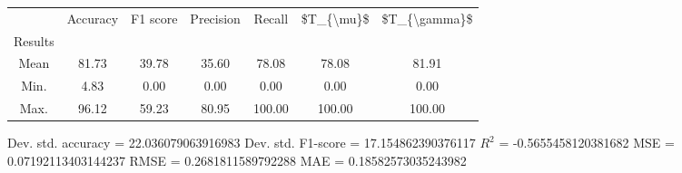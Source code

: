 \begin{tabular}{|c|c|c|c|c|c|c|}
\toprule
{} &  Accuracy &  F1 score &  Precision &  Recall &  \$T\_\{\textbackslash mu\}\$ &  \$T\_\{\textbackslash gamma\}\$ \\
Results &           &           &            &         &            &               \\
\hline
Mean    &     81.73 &     39.78 &      35.60 &   78.08 &      78.08 &         81.91 \\
Min.    &      4.83 &      0.00 &       0.00 &    0.00 &       0.00 &          0.00 \\
Max.    &     96.12 &     59.23 &      80.95 &  100.00 &     100.00 &        100.00 \\
\bottomrule
\end{tabular}

 Dev. std. accuracy = 22.036079063916983
 Dev. std. F1-score = 17.154862390376117
 $R^2$ = -0.5655458120381682
 MSE = 0.07192113403144237
 RMSE = 0.2681811589792288
 MAE = 0.18582573035243982